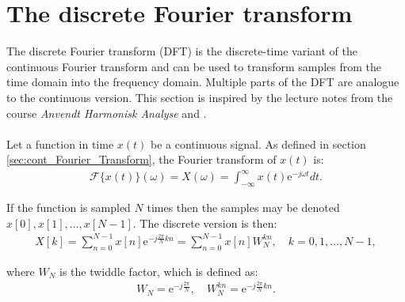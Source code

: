 \section{The discrete Fourier transform} \label{sec:DFT}
The discrete Fourier transform (DFT) is the discrete-time variant of the continuous Fourier transform and can be used to transform samples from the time domain into the frequency domain. Multiple parts of the DFT are analogue to the continuous version. This section is inspired by the lecture notes from the course \textit{Anvendt Harmonisk Analyse} and \cite{pages 252-264, FSP}.
\\ \\
Let a function in time $x(t)$ be a continuous signal. As defined in section \ref{sec:cont_Fourier_Transform}, the Fourier transform of $x(t)$ is:
\begin{align*}
\mathcal{F}\{x(t)\}(\omega) = X(\omega) = \int_{-\infty}^\infty x(t)\text{e}^{-j\omega t} dt.
\end{align*}

If the function is sampled $N$ times then the samples may be denoted $x[0],x[1],\dots,x[N-1]$. The discrete version is then:
\begin{align} \label{eq:DFT_vectors}
X[k] = \sum_{n=0}^{N-1} x[n]\text{e}^{-j\frac{2\pi}{N}kn} = \sum_{n=0}^{N-1} x[n] W_N^{kn}, \quad k = 0, 1, \dots, N-1,
\end{align}

where $W_N$ is the twiddle factor, which is defined as:
\begin{align*}
W_N = \text{e}^{-j\frac{2 \pi}{N}}, \quad W_N^{kn} = \text{e}^{-j\frac{2 \pi}{N}kn}.
\end{align*}

